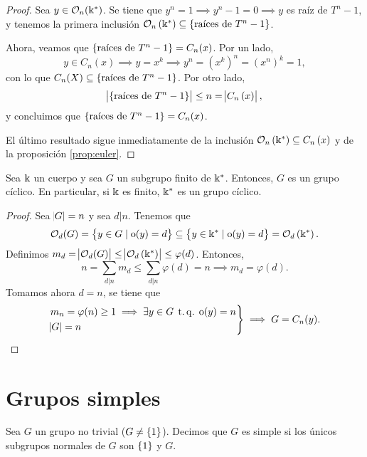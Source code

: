 \begin{proof}
    Sea $y \in \mathcal{O}_n(\Bbbk^\ast)$. Se tiene que  $y^n = 1 \implies y^n -1 = 0 \implies y$ es raíz de $T^n -1$, y tenemos la primera inclusión $\mathcal{O}_n\left( \Bbbk^\ast \right) \subseteq\left\{\text{raíces de } T^n -1\right\}$.
    
    \noindent Ahora, veamos que $\left\{ \text{raíces de } T^n -1\right\} = C_n(x)$. Por un lado,
    \[
        y \in C_n(x) \implies y = x^k \implies y^n = \left( x^k \right)^n = \left( x^n \right)^k = 1,
    \]
    con lo que $C_n(X) \subseteq \left\{\text{raíces de } T^n -1\right\}$. Por otro lado,
    \[
        \abs{\left\{\text{raíces de } T^n -1\right\}}\leq n =\abs{C_n\left( x\right)},
    \]
    y concluimos que $\left\{ \text{raíces de } T^n -1\right\} = C_n(x)$.
    
    \noindent El último resultado sigue inmediatamente de la inclusión $\mathcal{O}_n\left( \Bbbk^\ast \right)\subseteq C_n\left( x\right)$ y de la proposición \ref{prop:euler}.
\end{proof}

\begin{teo*}
    Sea $\Bbbk$ un cuerpo y sea $G$ un subgrupo finito de $\Bbbk^\ast$. Entonces, $G$ es un grupo
    cíclico. En particular, si $\Bbbk$ es finito, $\Bbbk^\ast$ es un grupo cíclico.
\end{teo*}

\begin{proof}
    Sea $\abs{G} = n$ y sea $d \vert n$. Tenemos que
    \[
        \mathcal{O}_d(G) = \left\{y \in G \mid \operatorname{o}(y) = d\right\} \subseteq
        \left\{y \in \Bbbk^\ast \mid \operatorname{o}(y) = d\right\} = \mathcal{O}_d\left( \Bbbk^\ast \right).
    \]
    Definimos $m_d = \abs{\mathcal{O}_d(G)} \leq \abs{\mathcal{O}_d\left( \Bbbk^\ast \right)} \leq \varphi(d)$.
    Entonces,
    \[
        n = \sum_{d \vert n} m_d \leq \sum_{d \vert n} \varphi(d) = n \implies m_d = \varphi(d).
    \]
    Tomamos ahora $d = n$, se tiene que
    \[
        \begin{rcases}
            m_n = \varphi(n) \geq 1 \implies \exists y \in G \operatorname{\;t.q.\;} \operatorname{o}(y) = n \\
            \abs{G} = n
        \end{rcases}
        \implies G = C_n(y).
    \]
\end{proof}

\section{Grupos simples}

\begin{defi}
    Sea $G$ un grupo no trivial ($G \neq \left\{1\right\}$). Decimos que $G$ es simple si los únicos subgrupos
    normales de $G$ son $\left\{1\right\}$ y $G$.
\end{defi}

